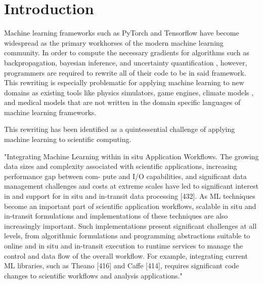 \section{Introduction}
\label{sec:intro}

Machine learning frameworks such as PyTorch\cite{paszke2017automatic} and Tensorflow\cite{abadi2016tensorflow} have become widespread as the primary workhorses of the modern machine learning community. In order to compute the necessary gradients for algorithms such as backpropagation\cite{hecht1992theory}, bayesian inference, and uncertainty quantification \cite{Wang2018-yr}, however, programmers are required to rewrite all of their code to be in said framework. This rewriting is especially problematic for applying machine learning to new domains as existing tools like physics simulators\cite{feng2016fastpm, broughton2020tensorflow, NIPS2018_7948, degrave2019differentiable, hu2019difftaichi}, game engines, climate models \cite{Stevens2020-ir}, and medical models\cite{alquraishi2019end} that are not written in the domain specific languages of machine learning frameworks. 

This rewriting has been identified as a quintessential challenge of applying machine learning to scientific computing.

"Integrating Machine Learning within in situ Application Workflows. The growing data sizes
and complexity associated with scientific applications, increasing performance gap between com-
pute and I/O capabilities, and significant data management challenges and costs at extreme scales
have led to significant interest in and support for in situ and in-transit data processing [432]. As
ML techniques become an important part of scientific application workflows, scalable in situ and
in-transit formulations and implementations of these techniques are also increasingly important.
Such implementations present significant challenges at all levels, from algorithmic formulations
and programming abstractions suitable to online and in situ and in-transit execution to runtime
services to manage the control and data flow of the overall workflow. For example, integrating
current ML libraries, such as Theano [416] and Caffe [414], requires significant code changes to
scientific workflows and analysis applications." \cite{Baker2019-ty}


